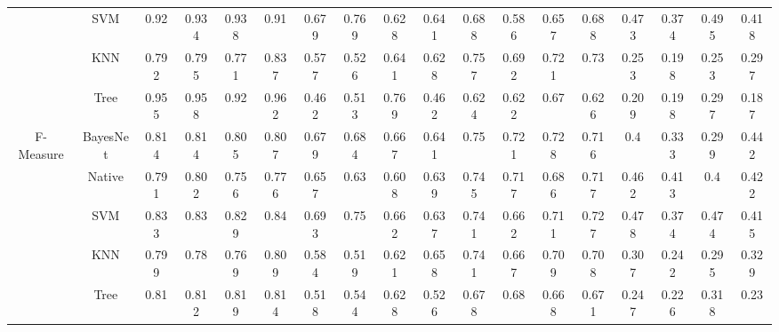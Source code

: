 {\begin{table*}[ht]
\begin{tabular}{|c|c|c|c|c|c|c|c|c|c|c|c|c|c|c|c|c|c|}
&SVM&	0.92	&0.934&	0.938&	0.91	&	0.679	&0.769	&0.628	&0.641&		0.688&	0.586	&0.657	&0.688	&	0.473	&0.374	&0.495	&0.418\\
&KNN&	0.792	&0.795	&0.771	&0.837		&0.577	&0.526	&0.641	&0.628		&0.757	&0.692	&0.721	&0.73	&	0.253	&0.198	&0.253	&0.297\\
&Tree&	0.955	&0.958	&0.92&	0.962		&0.462	&0.513	&0.769&	0.462&		0.624&	0.622&	0.67&	0.626&		0.209&	0.198&	0.297&	0.187\\
\hline
\multirow{5}{*}{F-Measure}
&BayesNet&0.814&	0.814	&0.805&	0.807	&	0.679&	0.684	&0.667	&0.641	&	0.75	&0.721&	0.728	&0.716	&	0.4	&0.333&	0.299	&0.442\\
&Native&0.791&	0.802&	0.756&	0.776		&0.657	&0.63&	0.608	&0.639	&	0.745	&0.717	&0.686	&0.717	&	0.462&	0.413	&0.4	&0.422\\
&SVM&	0.833	&0.83&	0.829&	0.84&		0.693&	0.75&	0.662&	0.637&		0.741&	0.662&	0.711&	0.727&		0.478&	0.374&	0.474	&0.415\\
&KNN&	0.799	&0.78	&0.769&	0.809&		0.584	&0.519	&0.621	&0.658	&	0.741	&0.667	&0.709	&0.708	&	0.307	&0.242	&0.295	&0.329\\
&Tree&	0.81	&0.812	&0.819&	0.814&		0.518&	0.544&	0.628&	0.526&		0.678&	0.68&	0.668	&0.671&		0.247&	0.226&	0.318&	0.23\\
\hline
\end{tabular}
\end{table*}

}
